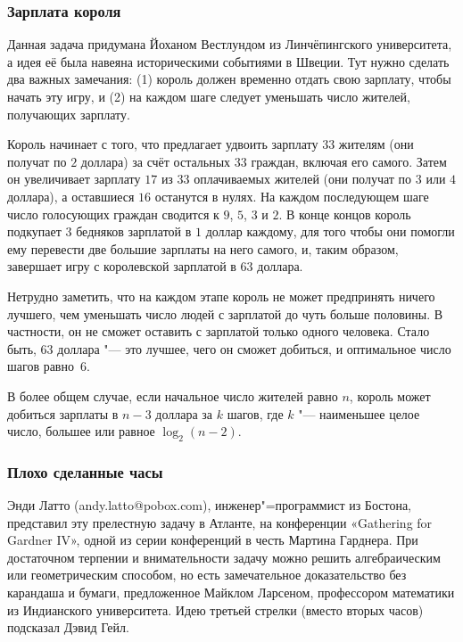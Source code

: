 \documentclass[twoside]{book}
\begin{document}
\subsubsection*{Зарплата короля}%

Данная задача придумана Йоханом Вестлундом %
из Линчёпингского университета, а идея её была навеяна историческими событиями в Швеции.
Тут нужно сделать два важных замечания: (1) король должен временно отдать свою зарплату, чтобы начать эту игру, и (2) на каждом шаге следует уменьшать число жителей, получающих зарплату.

Король начинает с того, что предлагает удвоить зарплату $33$ жителям (они получат по $2$ доллара) за счёт остальных $33$ граждан, включая его самого.
Затем он увеличивает зарплату $17$ из $33$ оплачиваемых жителей (они получат по $3$ или $4$ доллара), а оставшиеся $16$ останутся в нулях.
На каждом последующем шаге число голосующих граждан сводится к $9$, $5$, $3$ и $2$.
В конце концов король подкупает $3$ бедняков зарплатой в $1$ доллар каждому, для того чтобы они помогли ему перевести две большие зарплаты на него самого, и, таким образом, завершает игру с королевской зарплатой в $63$ доллара.

Нетрудно заметить, что на каждом этапе король не может предпринять ничего лучшего, чем уменьшать число людей с зарплатой до чуть больше половины.
В частности, он не сможет оставить с зарплатой только одного человека.
Стало быть, $63$ доллара "--- это лучшее, чего он сможет добиться, и оптимальное число шагов равно~$6$.
\heart

В более общем случае, если начальное число жителей равно $n$, король может добиться зарплаты в $n-3$ доллара за $k$ шагов, где $k$ "--- наименьшее целое число, большее или равное $\log_2(n-2)$.

\subsubsection*{Плохо сделанные часы}%

Энди Латто %
(andy.latto@pobox.com), инженер"=программист из Бостона, представил эту прелестную задачу в Атланте, на конференции «Gathering for Gard\-ner IV», одной из серии конференций в честь Мартина Гарднера.
При достаточном терпении и внимательности задачу можно решить алгебраическим или геометрическим способом, но есть замечательное доказательство без карандаша и бумаги, предложенное Майклом Ларсеном, %
профессором математики из Индианского университета.
Идею третьей стрелки (вместо вторых часов) подсказал Дэвид Гейл. %
\end{document}
